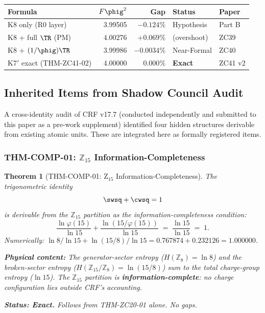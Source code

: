 \documentclass[12pt, a4paper]{article}
\newtheorem{theorem}{Theorem}[section]
\begin{document}
\begin{keybox}[title={K14 Gap Progression --- Complete History}]
\begin{center}
\renewcommand{\arraystretch}{1.3}
\small
\begin{tabular}{lrrll}
\toprule
Formula & $F\phig^2$ & Gap & Status & Paper \\
\midrule
K8 only (R0 layer)         & 3.99505 & $-0.124\%$ & Hypothesis & Part B \\
K8 + full $\TR$ (PM)       & 4.00276 & $+0.069\%$ & (overshoot) & ZC39 \\
K8 + $(1/\phig)\TR$        & 3.99986 & $-0.0034\%$ & Near-Formal & ZC40 \\
K7$'$ exact (THM-ZC41-02)  & 4.00000 & $0.000\%$   & \textbf{Exact} & ZC41 v2 \\
\bottomrule
\end{tabular}
\end{center}
\end{keybox}

\subsection{Inherited Items from Shadow Council Audit}
\label{sec:inherited}

A cross-identity audit of CRF v17.7 (conducted independently and
submitted to this paper as a pre-work supplement) identified four
hidden structures derivable from existing atomic units.
These are integrated here as formally registered items.

\subsubsection{THM-COMP-01: \texorpdfstring{$\mathbb{Z}_{15}$}{Z15} Information-Completeness}

\begin{theorem}[THM-COMP-01: Z$_{15}$ Information-Completeness]
\label{thm:comp01}
The trigonometric identity
\[
  \swsq + \cwsq = 1
\]
is derivable from the $\mathbb{Z}_{15}$ partition as the
information-completeness condition:
\[
  \frac{\ln\varphi(15)}{\ln 15}
  + \frac{\ln(15/\varphi(15))}{\ln 15}
  \;=\; \frac{\ln 15}{\ln 15}
  \;=\; 1.
\]
Numerically: $\ln 8/\ln 15 + \ln(15/8)/\ln 15 = 0.767874 + 0.232126 = 1.000000$.

\medskip\noindent\textbf{Physical content:}
The generator-sector entropy ($H(\mathbb{Z}_8) = \ln 8$) and the
broken-sector entropy ($H(\mathbb{Z}_{15}/\mathbb{Z}_8) = \ln(15/8)$)
sum to the total charge-group entropy ($\ln 15$).
The $\mathbb{Z}_{15}$ partition is \textbf{information-complete}:
no charge configuration lies outside CRF's accounting.

\medskip\noindent\textbf{Status: Exact.}
Follows from THM-ZC20-01 alone. No gaps.
\end{theorem}
\end{document}
